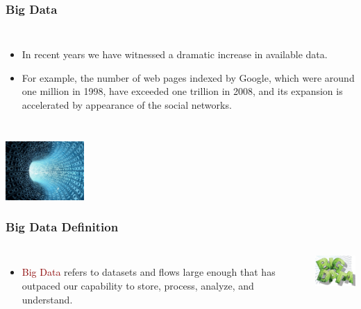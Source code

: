 \documentclass{beamer}
\begin{document}
\begin{frame}
\frametitle{Big Data}
\begin{columns}
\column{30em}
\begin{itemize}\itemsep2em
  \justifying
  \item In recent years we have witnessed a \textcolor{Ocean}{dramatic increase} in available data.
  \item For example, the \textcolor{Ocean}{number of web pages} indexed by Google, which were around \textcolor{TextGreen}{one million} in 1998, have exceeded \textcolor{TextGreen}{one trillion} in 2008, and its expansion is accelerated by appearance of the social networks.
\end{itemize}
\end{columns}
\vspace{0.35cm}
\hspace*{8.7cm}\includegraphics[width=3cm]{figs/zeroone.pdf}
\end{frame}

\begin{frame}
\frametitle{Big Data Definition}
\begin{columns}[c] 
\begin{itemize}\itemsep2em
  \justifying
  \item \textcolor{darkred}{Big Data} refers to datasets and flows \textcolor{Ocean}{large enough} that has outpaced our capability to \textcolor{TextGreen}{store}, \textcolor{TextGreen}{process}, \textcolor{TextGreen}{analyze}, and \textcolor{TextGreen}{understand}.
\end{itemize}

\includegraphics[width=3cm]{figs/big-data.pdf}
\end{columns}
\end{frame}
\end{document}
